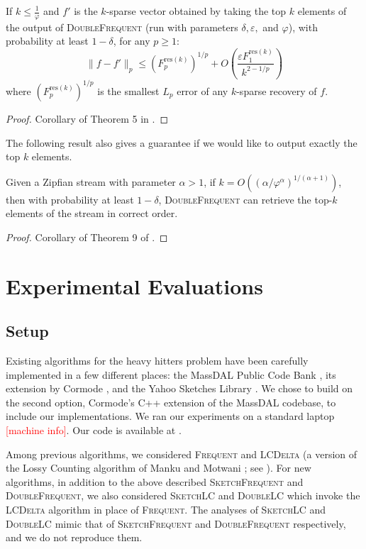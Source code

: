 \documentclass[sigconf,review=true,anonymous=true,screen]{acmart}
\newcommand{\eps}{\varepsilon}
\begin{document}
\begin{theorem}If $k \leq \frac1\varphi$ and $f'$ is the $k$-sparse vector obtained by taking the top $k$ elements of the output
of \textsc{DoubleFrequent} (run with parameters $\delta, \eps, $ and $\varphi$), with probability at least $1 - \delta$, for any $p \geq 1$:
$$\|f - f'\|_p \leq (F_p^{\text{res}(k)})^{1/p} + O\left(\frac{\eps F_1^{\text{res}(k)}}{k^{2-1/p}}\right)$$
where $(F^{\text{res}(k)}_p)^{1/p}$ is the smallest $L_p$ error of any $k$-sparse recovery of $f$.
\end{theorem}
\begin{proof} Corollary of Theorem 5 in \cite{BCIS}.
\end{proof}
The following result also gives a guarantee if we
would like to output exactly the top $k$ elements.
\begin{theorem}
Given a Zipfian stream with parameter $\alpha > 1$, if $k = O((\alpha/\varphi^\alpha)^{1/(\alpha+1)})$, then with probability at least 
$1-\delta$, \textsc{DoubleFrequent} can retrieve the
top-$k$ elements of the stream in correct order.
\end{theorem}
\begin{proof}
Corollary of Theorem 9 of \cite{BCIS}.
\end{proof}

\section{Experimental Evaluations}

\subsection{Setup}
Existing algorithms for the heavy hitters problem have been carefully implemented in a few different places:
the MassDAL Public Code Bank \cite{massdal}, its extension by Cormode \cite{corimpl}, and the Yahoo Sketches Library \cite{yahoolib}.
We chose to build on the second option, Cormode's C++ extension of the MassDAL codebase, to include our implementations. We ran our experiments on a standard
laptop \textcolor{red}{[machine info]}. Our code is available at \cite{ourgit}.

Among previous algorithms, we considered \textsc{Frequent} and \textsc{LCDelta} (a version of the Lossy Counting algorithm of Manku and Motwani \cite{MM02}; see \cite{FrequentSurvey}). 
For new algorithms, in addition to the above described \textsc{SketchFrequent} and \textsc{DoubleFrequent}, we also considered \textsc{SketchLC} and \textsc{DoubleLC}
which invoke the \textsc{LCDelta} algorithm in place of \textsc{Frequent}. The analyses of \textsc{SketchLC} and \textsc{DoubleLC} mimic that of \textsc{SketchFrequent} and \textsc{DoubleFrequent}
respectively, and we do not reproduce them.
\end{document}
